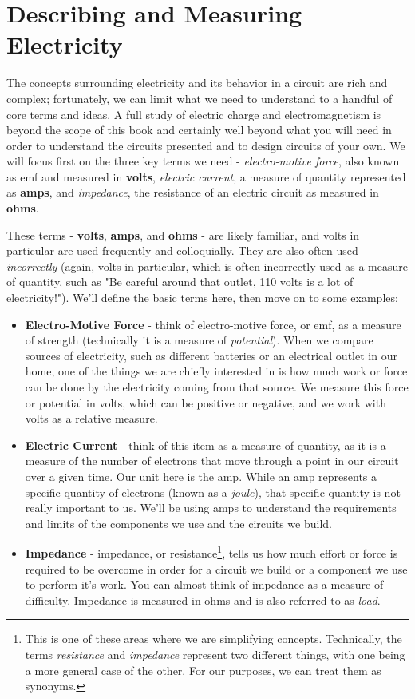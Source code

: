 \section{Describing  and Measuring Electricity}

The concepts surrounding electricity and its behavior in a circuit are rich and complex; fortunately, we can limit what we need to understand to a handful of core terms and ideas. A full study of electric charge and electromagnetism is beyond the scope of this book and certainly well beyond what you will need in order to understand the circuits presented and to design circuits of your own. We will focus first on the three key terms we need - \textit{electro-motive force}, also known as emf and measured in \textbf{volts}, \textit{electric current}, a measure of quantity represented as \textbf{amps}, and \textit{impedance}, the resistance of an electric circuit as measured in \textbf{ohms}.

These terms - \textbf{volts}, \textbf{amps}, and \textbf{ohms} - are likely familiar, and volts in particular are used frequently and colloquially. They are also often used \textit{incorrectly} (again, volts in particular, which is often incorrectly used as a measure of quantity, such as "Be careful around that outlet, 110 volts is a lot of electricity!"). We'll define the basic terms here, then move on to some examples:

\begin{itemize}
\item \textbf{Electro-Motive Force} - think of electro-motive force, or emf, as a measure of strength (technically it is a measure of \textit{potential}). When we compare sources of electricity, such as different batteries or an electrical outlet in our home, one of the things we are chiefly interested in is how much work or force can be done by the electricity coming from that source. We measure this force or potential in volts, which can be positive or negative, and we work with volts as a relative measure.
\item \textbf{Electric Current} - think of this item as a measure of quantity, as it is a measure of the number of electrons that move through a point in our circuit over a given time. Our unit here is the amp. While an amp represents a specific quantity of electrons (known as a \textit{joule}), that specific quantity is not really important to us. We'll be using amps to understand the  requirements and limits of the components we use and the circuits we build. 
\item \textbf{Impedance} - impedance, or resistance\footnote{This is one of these areas where we are simplifying concepts. Technically, the terms \textit{resistance} and \textit{impedance} represent two different things, with one being a more general case of the other. For our purposes, we can treat them as synonyms.}, tells us how much effort or force is required to be overcome in order for a circuit we build or a component we use to perform it's work. You can almost think of impedance as a measure of difficulty. Impedance is measured in ohms and is also referred to as \textit{load}.
\end{itemize}


